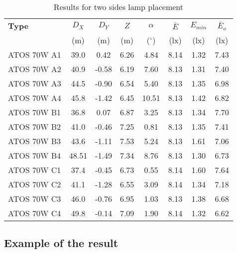 \begin{table}[htb]
	\renewcommand{\arraystretch}{1.3}
	\caption{Results for two sides lamp placement}
 	\label{tab:twosideLamps}
	\centering
  \begin{tabular}{ l | c | c | c | c | c | c | c }
    \hline
    \textbf{Type} & $D_X$ & $D_Y$ & $Z$ & $\alpha$ & $\overline{E}$ & $E_{min}$ & $\overline{E}_o$\\ 
    & (m) & (m) & (m) & ($^\circ$) & (lx) & (lx) & (lx)\\ \hline
    ATOS 70W A1 & 39.0 & 0.42 & 6.26 & 4.84 & 8.14 & 1.32 & 7.43 \\ \hline
    ATOS 70W A2 & 40.9 & -0.58 & 6.19 & 7.60 & 8.13 & 1.31 & 7.40\\ \hline
    ATOS 70W A3 & 44.5 & -0.90 & 6.54 & 5.40 & 8.13 & 1.35 & 6.98\\ \hline
    ATOS 70W A4 & 45.8 & -1.42 & 6.45 & 10.51 & 8.13 & 1.42 & 6.82\\ \hline\hline
    ATOS 70W B1 & 36.8 & 0.07 & 6.87 & 3.25 & 8.13 & 1.34 & 7.70\\ \hline
    ATOS 70W B2 & 41.0 & -0.46 & 7.25 & 0.81 & 8.13 & 1.35 & 7.41\\ \hline
    ATOS 70W B3 & 43.6 & -1.11 & 7.53 & 5.24 & 8.13 & 1.61 & 7.06\\ \hline
    ATOS 70W B4 & 48.51 & -1.49 & 7.34 & 8.76 & 8.13 & 1.30 & 6.73\\ \hline\hline
    ATOS 70W C1 & 37.4 & -0.45 & 6.73 & 0.55 & 8.14 & 1.60 & 7.64\\ \hline
    ATOS 70W C2 & 41.1 & -1.28 & 6.55 & 3.09 & 8.14 & 1.34 & 7.18\\ \hline
    ATOS 70W C3 & 46.0 & -0.76 & 6.95 & 1.03 & 8.13 & 1.38 & 6.68\\ \hline
    ATOS 70W C4 & 49.8 & -0.14 & 7.09 & 1.90 & 8.14 & 1.32 & 6.62\\ \hline
  \end{tabular}
\end{table}

\subsection{Example of the result}